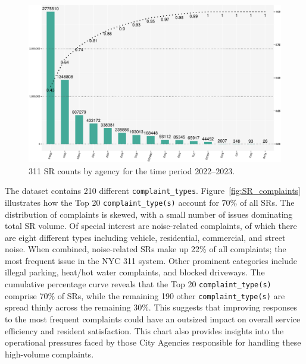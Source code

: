\documentclass[linenumber]{jdsart}
\begin{document}
\begin{figure}[tbp]
	\centering
	\includegraphics[width = \textwidth]{SRs_by_Agency.pdf}
  	\caption{311 SR counts by agency for the time period 2022--2023.}
	\label{fig:SRcountbyAgency}
\end{figure}

The dataset contains 210 different \texttt{complaint\_types}. 
Figure~\ref{fig:SR_complaints} illustrates how the Top 20 
\texttt{complaint\_type(s)} account for 70\% 
of all SRs. The distribution of complaints is skewed, 
with a small number of issues dominating total SR volume. 
Of special interest are noise-related complaints, of 
which there are eight different types including vehicle, 
residential, commercial, and street noise. When 
combined, noise-related SRs make up 22\% of all 
complaints; the most frequent issue in the NYC 311 system. 
Other prominent categories include illegal parking, heat/hot water 
complaints, and blocked driveways. The cumulative percentage curve 
reveals that the Top 20 \texttt{complaint\_type(s)} comprise 70\% of SRs,
while the remaining 190 other \texttt{complaint\_type(s)}  are spread thinly 
across the remaining 30\%. This suggests that improving 
responses to the most frequent complaints could have an 
outsized impact on overall service efficiency and resident 
satisfaction. This chart also provides insights into the 
operational pressures faced by those City Agencies 
responsible for handling these high-volume complaints.
\end{document}
